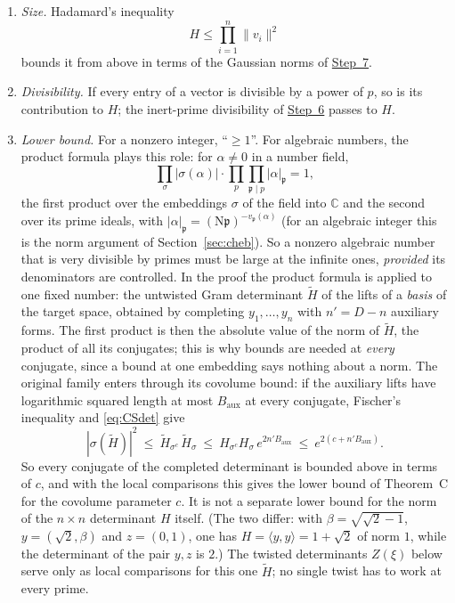 \documentclass[11pt]{amsart}
\numberwithin{equation}{section}
\theoremstyle{definition}
\theoremstyle{remark}
\newcommand{\C}{\mathbb C}
\begin{document}
\begin{enumerate}[leftmargin=2em]
\item \emph{Size.} Hadamard's inequality
\begin{equation}
 H\le\prod_{i=1}^n\|v_i\|^2
\end{equation}
bounds it from above in terms of the Gaussian norms of \hyperref[step:7]{Step~7}.
\item \emph{Divisibility.} If every entry of a vector is divisible by a power of $p$, so is its contribution to $H$; the inert-prime divisibility of \hyperref[step:6]{Step~6} passes to $H$.
\item \emph{Lower bound.} For a nonzero integer, ``$\ge1$''. For algebraic numbers, the product formula plays this role: for $\alpha\ne0$ in a number field,
\begin{equation}
 \prod_\sigma|\sigma(\alpha)|\cdot\prod_p\prod_{\mathfrak p\mid p}|\alpha|_{\mathfrak p}=1,
\end{equation}
the first product over the embeddings $\sigma$ of the field into $\C$ and the second over its prime ideals, with $|\alpha|_{\mathfrak p}=(\mathrm N\mathfrak p)^{-v_{\mathfrak p}(\alpha)}$ (for an algebraic integer this is the norm argument of Section~\ref{sec:cheb}). So a nonzero algebraic number that is very divisible by primes must be large at the infinite ones, \emph{provided} its denominators are controlled. In the proof the product formula is applied to one fixed number: the untwisted Gram determinant $\widetilde H$ of the lifts of a \emph{basis} of the target space, obtained by completing $y_1,\dots,y_n$ with $n'=D-n$ auxiliary forms. The first product is then the absolute value of the norm of $\widetilde H$, the product of all its conjugates; this is why bounds are needed at \emph{every} conjugate, since a bound at one embedding says nothing about a norm. The original family enters through its covolume bound: if the auxiliary lifts have logarithmic squared length at most $B_{\mathrm{aux}}$ at every conjugate, Fischer's inequality and \eqref{eq:CSdet} give
\begin{equation}\label{eq:normHtilde}
 |\sigma(\widetilde H)|^2\ \le\ \widetilde H_{\sigma^c}\,\widetilde H_\sigma\ \le\ H_{\sigma^c}H_\sigma\,e^{2n'B_{\mathrm{aux}}}\ \le\ e^{2(c+n'B_{\mathrm{aux}})} .
\end{equation}
So every conjugate of the completed determinant is bounded above in terms of $c$, and with the local comparisons this gives the lower bound of Theorem~C for the covolume parameter $c$. It is not a separate lower bound for the norm of the $n\times n$ determinant $H$ itself. (The two differ: with $\beta=\sqrt{\sqrt2-1}$, $y=(\sqrt2,\beta)$ and $z=(0,1)$, one has $H=\langle y,y\rangle=1+\sqrt2$ of norm $1$, while the determinant of the pair $y,z$ is $2$.) The twisted determinants $Z(\xi)$ below serve only as local comparisons for this one $\widetilde H$; no single twist has to work at every prime.
\end{enumerate}
\end{document}
